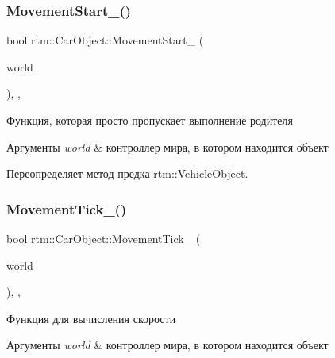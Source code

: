 \subsubsection{\texorpdfstring{Movement\+Start\+\_\+()}{MovementStart\_()}}
{\footnotesize\ttfamily bool rtm\+::\+Car\+Object\+::\+Movement\+Start\+\_\+ (\begin{DoxyParamCaption}\item[{\hyperlink{classrtm_1_1_world_controller}{World\+Controller} $\ast$const}]{world }\end{DoxyParamCaption})\hspace{0.3cm}{\ttfamily [override]}, {\ttfamily [protected]}, {\ttfamily [virtual]}}



Функция, которая просто пропускает выполнение родителя 


\begin{DoxyParams}{Аргументы}
{\em world} & контроллер мира, в котором находится объект \\
\hline
\end{DoxyParams}


Переопределяет метод предка \hyperlink{classrtm_1_1_vehicle_object_aa02e0b8f3fa159939f370938e45abf88}{rtm\+::\+Vehicle\+Object}.

\mbox{\label{classrtm_1_1_car_object_abe89fea4893e244d9f6fb17c596b5ae0}} 
\subsubsection{\texorpdfstring{Movement\+Tick\+\_\+()}{MovementTick\_()}}
{\footnotesize\ttfamily bool rtm\+::\+Car\+Object\+::\+Movement\+Tick\+\_\+ (\begin{DoxyParamCaption}\item[{\hyperlink{classrtm_1_1_world_controller}{World\+Controller} $\ast$const}]{world }\end{DoxyParamCaption})\hspace{0.3cm}{\ttfamily [override]}, {\ttfamily [protected]}, {\ttfamily [virtual]}}



Функция для вычисления скорости 


\begin{DoxyParams}{Аргументы}
{\em world} & контроллер мира, в котором находится объект \\
\hline
\end{DoxyParams}


